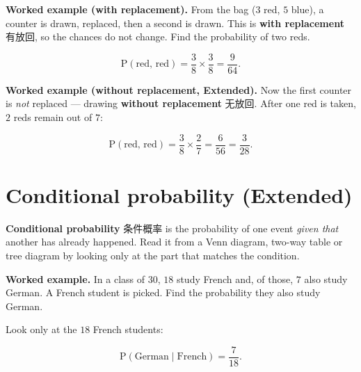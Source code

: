 \documentclass[11pt]{article}
\begin{document}
\textbf{Worked example (with replacement).} From the bag ($3$ red, $5$ blue), a counter is drawn, replaced, then a second is drawn. This is \textbf{with replacement} 有放回, so the chances do not change. Find the probability of two reds.

\[
\text{P}(\text{red, red}) = \frac{3}{8} \times \frac{3}{8} = \frac{9}{64}.
\]

\textbf{Worked example (without replacement, Extended).} Now the first counter is \emph{not} replaced — drawing \textbf{without replacement} 无放回. After one red is taken, $2$ reds remain out of $7$:

\[
\text{P}(\text{red, red}) = \frac{3}{8} \times \frac{2}{7} = \frac{6}{56} = \frac{3}{28}.
\]

\section*{Conditional probability (Extended)}

\textbf{Conditional probability} 条件概率 is the probability of one event \emph{given that} another has already happened. Read it from a Venn diagram, two-way table or tree diagram by looking only at the part that matches the condition.

\textbf{Worked example.} In a class of $30$, $18$ study French and, of those, $7$ also study German. A French student is picked. Find the probability they also study German.

Look only at the $18$ French students:

\[
\text{P}(\text{German} \mid \text{French}) = \frac{7}{18}.
\]
\end{document}
